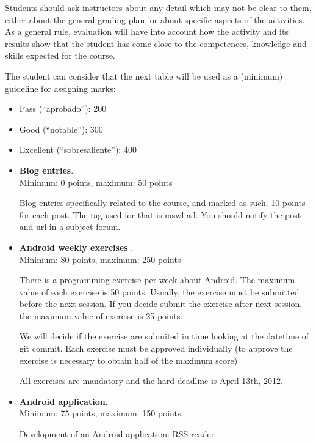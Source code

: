 \documentclass[a4paper]{article}
\begin{document}
Students should ask instructors about any detail which may not be
clear to them, either about the general grading plan, or about
specific aspects of the activities. As a general rule, evaluation will
have into account how the activity and its results show that the
student has come close to the competences, knowledge and skills
expected for the course.

The student can consider that the next table will be used as a
(minimum) guideline for assigning marks:

\begin{itemize}
\item Pass (``aprobado''): 200
\item Good (``notable''): 300
\item Excellent (``sobresaliente''): 400
\end{itemize}

\begin{itemize}
\item \textbf{Blog entries}. \\
  Minimum: 0 points, maximum: 50 points

  Blog entries specifically related to the course, and marked as
  such. 10 points for each post. The tag used for that is mswl-ad.
  You should notify the post and url in a subject forum.

\item \textbf{Android weekly exercises }. \\
  Minimum: 80 points, maximum: 250 points

There is a programming exercise per week about Android. The maximum
value of each exercise is 50 points. Usually, the exercise must be
submitted before the next session. If you decide submit the exercise
after next session, the maximum value of exercise is 25 points.

We will decide if the exercise are submited in time looking at the
datetime of git commit. Each exercise must be approved individually
(to approve the exercise is necessary to obtain half of the maximum score)

All exercises are mandatory and the hard deadline is April 13th, 2012.

\item \textbf{Android application}. \\
  Minimum: 75 points, maximum: 150 points

Development of an Android application: RSS reader 

\end{itemize}
\end{document}
